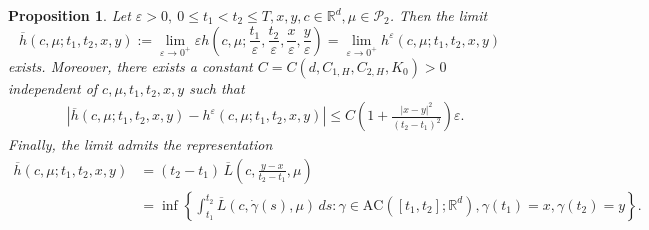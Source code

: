 \documentclass[reqno,11pt]{amsart}
\newtheorem{proposition}[theorem]{Proposition}
\numberwithin{equation}{section}
\newcommand{\R}{\mathbb{R}} %
\newcommand{\e}{\varepsilon}
\newcommand{\ep}{\varepsilon}
\renewcommand{\bar}{\overline}
\begin{document}
\begin{proposition}\label{prop:rocmu}
Let $\ep>0,\ 0\leq t_1 < t_2\leq T, x,y, c\in\mathbb{R}^d, \mu \in \mathcal{P}_2$. Then the limit
\[
\bar{h} \left(c,\mu;t_1,  t_2,x,y\right):=\lim_{\ep\to 0^+} \ep h\left(c,\mu; \frac{t_1}{\ep}, \frac{t_2}{\ep},\frac{x}{\ep},\frac{y}{\ep}\right)= \lim_{\ep\to 0^+}  h^\e (c,\mu;t_1, t_2, x,y )
\]
exists. Moreover, there exists a constant $C=C(d, C_{1,H},C_{2,H},K_0)>0$ independent of $c, \mu, t_1, t_2, x, y$ such that
\[
\begin{aligned}
&\left|\bar{h}\left(c,\mu; t_1,t_2,x,y\right)- h^\e\left(c,\mu;t_1, t_2, x, y\right)\right|\leq C\left(1+\frac{|x-y|^2}{(t_2-t_1)^2}\right) \ep.
\end{aligned}
\]
Finally, the limit admits the representation
\[
\begin{aligned}
\bar{h}(c,\mu;t_1,t_2,x,y)
&= (t_2 - t_1)\,
\bar{L}\!\left(c,\frac{y-x}{t_2 - t_1}, \mu\right)\\
&=\inf\left\{\int_{t_1}^{t_2} \bar{L}(c,\dot{\gamma}(s), \mu)\,ds:\gamma \in \mathrm{AC}\left([t_1, t_2];\R^d\right), \gamma(t_1)=x, \gamma(t_2)=y\right\}.
\end{aligned}
\]
\end{proposition}





\end{document}
